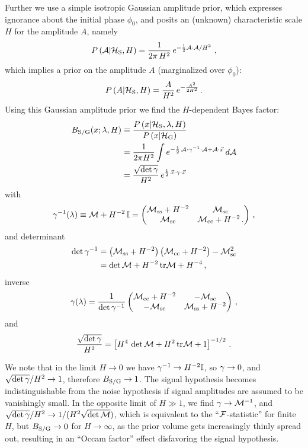 \documentclass[aps,prd,onecolumn,notitlepage,nofootinbib,superscriptaddress,altaffilletter,floatfix]{revtex4-1}
\begin{document}
Further we use a simple isotropic Gaussian amplitude prior, which expresses ignorance about the initial phase $\phi_0$, and posits an (unknown)
characteristic scale $H$ for the amplitude $A$, namely
\begin{equation}
  \label{eq:22}
  P\left({\mathcal A}\middle|\mathcal{H}_{\mathrm{S}},H\right) = \frac{1}{2\pi\,H^2}\,e^{-\frac{1}{2}{{\mathcal A}\cdot{\mathcal A}}/H^2}\,\,,
\end{equation}
which implies a prior on the amplitude $A$ (marginalized over $\phi_0$):
\begin{equation}
  \label{eq:28}
  P\left(A\middle|\mathcal{H}_{\mathrm{S}}, H\right) = \frac{A}{H^2}\,e^{-\frac{A^2}{2H^2}}\,.
\end{equation}
Using this Gaussian amplitude prior we find the $H$-dependent Bayes factor:
\begin{align}
  \label{eq:29}
  B_{\mathrm{S/G}}(x;\lambda,H) &\equiv \frac{P\left(x\middle|\mathcal{H}_{\mathrm{S}},\lambda,H\right)}{P\left(x\middle|\mathcal{H}_{\mathrm{G}}\right)}\\
  &=\frac{1}{2\pi H^2}\int e^{-\frac{1}{2}\,{\mathcal A}\cdot\gamma^{-1}\cdot{\mathcal A} + {\mathcal A}\cdot\vec{x}}\,d{\mathcal A}\\
  &= \frac{\sqrt{\det\gamma}}{H^2}\, e^{\frac{1}{2}\,\vec{x}\cdot\gamma\cdot\vec{x}}
\end{align}
with
\begin{equation}
  \label{eq:25}
  \gamma^{-1}(\lambda) \equiv \mathcal{M} + H^{-2}\,\mathbb{I} =
  \begin{pmatrix}
    \mathcal{M}_{\mathrm{ss}} + H^{-2} & \mathcal{M}_{\mathrm{sc}} \\
    \mathcal{M}_{\mathrm{sc}}        & \mathcal{M}_{\mathrm{cc}} + H^{-2}\,.
  \end{pmatrix}\,,
\end{equation}
and determinant
\begin{align}
  \label{eq:39}
  \det\gamma^{-1} &= \left(\mathcal{M}_{\mathrm{ss}} + H^{-2}\right)\left(\mathcal{M}_{\mathrm{cc}}+H^{-2}\right) - \mathcal{M}_{\mathrm{sc}}^2\\
  &=\det\mathcal{M} + H^{-2}\,\mathrm{tr}\mathcal{M} + H^{-4}\,,
\end{align}
inverse
\begin{equation}
  \label{eq:41}
  \gamma(\lambda) = \frac{1}{\det\gamma^{-1}}
  \begin{pmatrix}
    \mathcal{M}_{\mathrm{cc}} + H^{-2} & -\mathcal{M}_{\mathrm{sc}} \\
    -\mathcal{M}_{\mathrm{sc}}        & \mathcal{M}_{\mathrm{ss}} + H^{-2}
  \end{pmatrix}\,,
\end{equation}
and
\begin{equation}
  \label{eq:40}
  \frac{\sqrt{\det\gamma}}{H^2} = \left[H^4\,\det\mathcal{M} + H^2\,\mathrm{tr}\mathcal{M} + 1\right]^{-1/2}\,.
\end{equation}

We note that in the limit $H\rightarrow0$ we have $\gamma^{-1}\rightarrow H^{-2}\mathbb{I}$, so $\gamma\rightarrow0$, and
$\sqrt{\det\gamma}/H^2\rightarrow 1$, therefore $B_{\mathrm{S/G}}\rightarrow 1$.
The signal hypothesis becomes indistinguishable from the noise hypothesis if signal amplitudes are assumed to be vanishingly small.
In the opposite limit of $H\gg 1$, we find $\gamma\rightarrow\mathcal{M}^{-1}$, and $\sqrt{\det\gamma}/H^2\rightarrow 1/(H^2\sqrt{\det\mathcal{M}})$, which is equivalent to
the ``$\mathcal{F}$-statistic'' for finite $H$, but $B_{\mathrm{S/G}}\rightarrow 0$ for $H\rightarrow \infty$, as the prior volume gets increasingly thinly spread out,
resulting in an ``Occam factor'' effect disfavoring the signal hypothesis.
\end{document}
